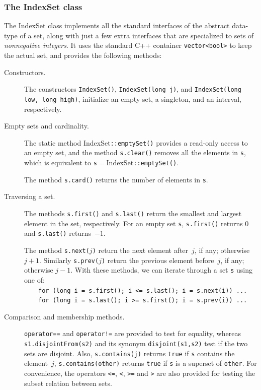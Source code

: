 \documentclass[14pt]{extarticle}
\def\IndexSet{\textsf{IndexSet}}
\begin{document}
\subsubsection{The {\IndexSet} class}
The {\IndexSet} class implements all the standard interfaces of the
abstract data-type of a set, along with just a few extra interfaces
that are specialized to sets of \emph{nonnegative integers}. It uses the standard
C++ container \texttt{vector<bool>} to keep the actual set, and
provides the following methods:
\begin{description}
\item[Constructors.] The constructors \texttt{IndexSet()},
\texttt{IndexSet(long j)}, and \texttt{IndexSet(long low, long high)},
initialize an empty set, a singleton, and an interval,
respectively.

\item[Empty sets and cardinality.]
The static method {\IndexSet}\texttt{::emptySet()}
provides a read-only access to an empty set, and the method
\texttt{s.clear()} removes all the elements in \texttt{s}, which
is equivalent to \texttt{s}$=${\IndexSet}\texttt{::emptySet()}.

The method \texttt{s.card()} returns the number of elements in 
\texttt{s}.

\item[Traversing a set.] The methods \texttt{s.first()} and
\texttt{s.last()} return the smallest and largest element in the
set, respectively. For an empty set \texttt{s}, \texttt{s.first()}
returns 0 and \texttt{s.last()} returns~$-1$.

The method \texttt{s.next($j$)} return the next element after~$j$,
if any; otherwise $j+1$. Similarly \texttt{s.prev($j$)} return the
previous element before~$j$, if any; otherwise $j-1$. With these
methods, we can iterate through a set \texttt{s} using one of:\\
\mbox{~~~~}\texttt{for (long i = s.first(); i <= s.last(); i = s.next(i)) ...}\\
\mbox{~~~~}\texttt{for (long i = s.last(); i >= s.first(); i = s.prev(i)) ...}

\item[Comparison and membership methods.] 
\texttt{operator==} and \texttt{operator!=} are provided to
test for equality, whereas \texttt{s1.disjointFrom(s2)} and its
synonym \texttt{disjoint(s1,s2)} test if the two sets are disjoint.
Also,
\texttt{s.contains(j)} returns \texttt{true} if \texttt{s} contains
the element~$j$, \texttt{s.contains(other)} returns \texttt{true}
if \texttt{s} is a superset of \texttt{other}. For convenience, the
operators \texttt{<=}, \texttt{<}, \texttt{>=} and \texttt{>} are
also provided for testing the subset relation between sets.


\end{description}
\end{document}
